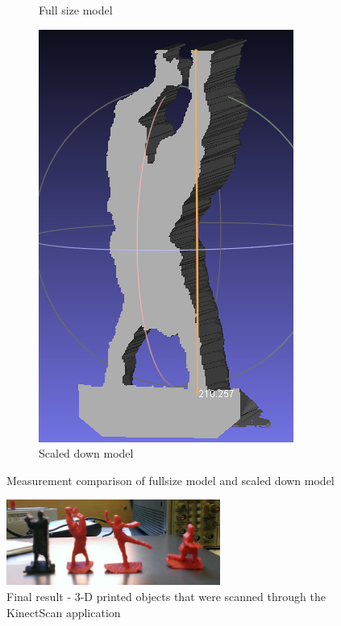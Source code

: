 \documentclass[pdftex,10.5pt]{report}
\begin{document}
\begin{figure}[H]
\begin{subfigure}[H]{0.4\textwidth}
		\caption{Full size model}
	\end{subfigure}
	\begin{subfigure}[H]{0.4\textwidth}
		\includegraphics[width=\textwidth]{figures/ryanhandstandmeasure}
		\caption{Scaled down model}
	\end{subfigure}
	\caption{Measurement comparison of fullsize model and scaled down model}
	\label{fig:sizes}
\end{figure}

\begin{figure}[H]
	\centering
	\includegraphics[width=70mm]{figures/actionfigures.jpg}
	\caption{Final result - 3-D printed objects that were scanned through the KinectScan application}
	\label{actionfigures}
\end{figure}
\end{document}
